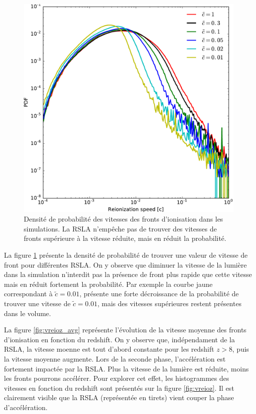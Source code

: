 \begin{figure}
        \includegraphics[width=.95\linewidth]{img/04_mapreio/PDF_v_reio.pdf} 
        \caption[PDF des vitesses de fronts]{Densité de probabilité des vitesses des fronts d'ionisation dans les simulations.
        La RSLA n’empêche pas de trouver des vitesses de fronts supérieure à la vitesse réduite, mais en réduit la probabilité.
		\label{fig:pdfv}}
\end{figure}

La figure \ref{fig:pdfv} présente la densité de probabilité de trouver une valeur de vitesse de front pour différentes \ac{RSLA}.
On y observe que diminuer la vitesse de la lumière dans la simulation n'interdit pas la présence de front plus rapide que cette vitesse mais en réduit fortement la probabilité.
Par exemple la courbe jaune correspondant à $\tilde{c}=0.01$, présente une forte décroissance de la probabilité de  trouver une vitesse de  $\tilde{c}=0.01$, mais des vitesses supérieures restent présentes dans le volume.

La figure \ref{fig:vreioz_avg} représente l'évolution de la vitesse moyenne des fronts d'ionisation en fonction du redshift.
On y observe que, indépendament de la \ac{RSLA}, la vitesse moenne est tout d'abord constante pour les redshift $z>8$, puis la vitesse moyenne augmente.
Lors de la seconde phase, l'accélération est fortement impactée par la \ac{RSLA}.
Plus la vitesse de la lumière est réduite, moins les fronts pourrons accélérer.
Pour explorer cet effet, les histogrammes des vitesses en fonction du redshift sont présentés sur la figure \ref{fig:vreioz}.
Il est clairement visible que la \ac{RSLA} (représentée en tirets) vient couper la phase d'accélération.

